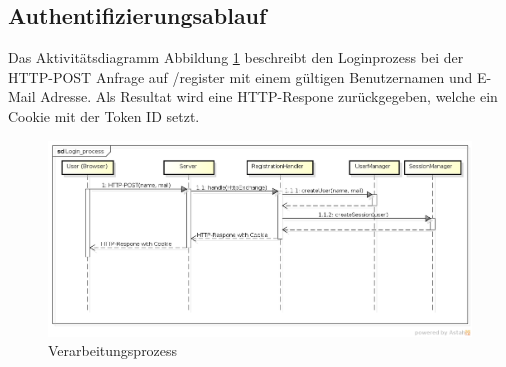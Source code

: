 \subsection{Authentifizierungsablauf}

Das Aktivitätsdiagramm Abbildung \ref{fig:process} beschreibt den Loginprozess bei der HTTP-POST Anfrage auf /register mit einem gültigen Benutzernamen und E-Mail Adresse.
Als Resultat wird eine HTTP-Respone zurückgegeben, welche ein Cookie mit der Token ID setzt.

\begin{figure}[H]
	\begin{center}
		\includegraphics[width=1.0\textwidth]{./content/Login_process.png}
	\end{center}
	\caption{Verarbeitungsprozess}
	\label{fig:process}
\end{figure}
